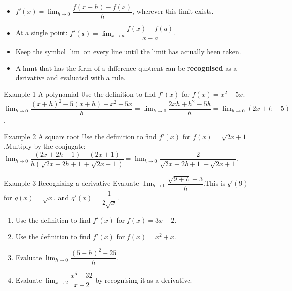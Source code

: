 \documentclass[11pt]{article}
\begin{document}

\begin{ideabox}
\begin{itemize}[leftmargin=*,itemsep=2pt,topsep=2pt]
  \item $f'(x)=\displaystyle\lim_{h\to 0}\dfrac{f(x+h)-f(x)}{h}$, wherever this limit exists.
  \item At a single point: $f'(a)=\displaystyle\lim_{x\to a}\dfrac{f(x)-f(a)}{x-a}$.
  \item Keep the symbol $\lim$ on every line until the limit has actually been taken.
  \item A limit that has the form of a difference quotient can be \textbf{recognised} as a derivative and evaluated with a rule.
\end{itemize}
\end{ideabox}

\begin{example}{Example 1 \textperiodcentered{} A polynomial}
Use the definition to find $f'(x)$ for $f(x)=x^2-5x$.\soln $\displaystyle\lim_{h\to 0}\dfrac{(x+h)^2-5(x+h)-x^2+5x}{h}=\displaystyle\lim_{h\to 0}\dfrac{2xh+h^2-5h}{h}=\displaystyle\lim_{h\to 0}(2x+h-5)$.
\end{example}

\begin{example}{Example 2 \textperiodcentered{} A square root}
Use the definition to find $f'(x)$ for $f(x)=\sqrt{2x+1}$.\soln Multiply by the conjugate: $\displaystyle\lim_{h\to 0}\dfrac{(2x+2h+1)-(2x+1)}{h\left(\sqrt{2x+2h+1}+\sqrt{2x+1}\right)}=\displaystyle\lim_{h\to 0}\dfrac{2}{\sqrt{2x+2h+1}+\sqrt{2x+1}}$.
\end{example}

\begin{example}{Example 3 \textperiodcentered{} Recognising a derivative}
Evaluate $\displaystyle\lim_{h\to 0}\dfrac{\sqrt{9+h}-3}{h}$.\soln This is $g'(9)$ for $g(x)=\sqrt{x}$, and $g'(x)=\dfrac{1}{2\sqrt x}$.
\end{example}

\newpage
{}

\begin{enumerate}[leftmargin=*,itemsep=2pt]
  \item Use the definition to find $f'(x)$ for $f(x)=3x+2$.\work{2.3cm}
  \item Use the definition to find $f'(x)$ for $f(x)=x^2+x$.\work{2.3cm}
  \item Evaluate $\displaystyle\lim_{h\to 0}\dfrac{(5+h)^2-25}{h}$.\work{2.3cm}
  \item Evaluate $\displaystyle\lim_{x\to 2}\dfrac{x^5-32}{x-2}$ by recognising it as a derivative.\work{2.3cm}
\end{enumerate}
\end{document}
